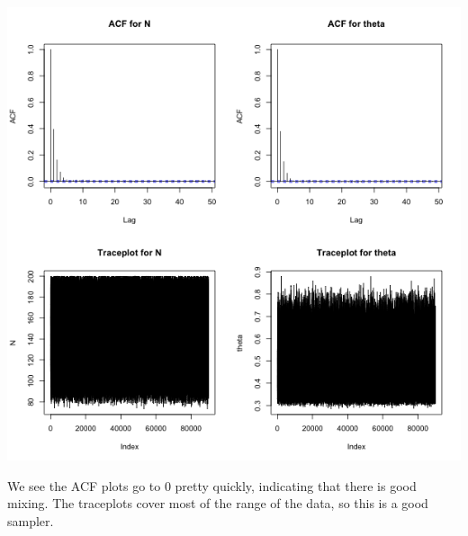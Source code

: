 \documentclass[letterpaper,10pt]{amsart}
\begin{document}
\begin{enumerate}[{1}.1]
\begin{center}
\includegraphics[scale=0.75]{Stat221WaterbuckDiag.png}
\end{center}
We see the ACF plots go to 0 pretty quickly, indicating that there is good mixing. The traceplots cover most of the range of the data, so this is a good sampler.


\end{enumerate}
\end{document}
